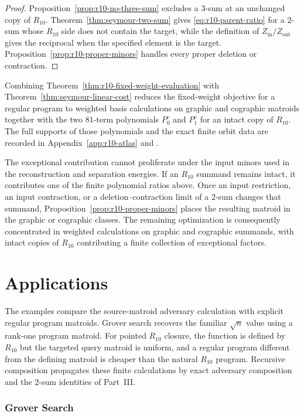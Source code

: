 \documentclass[11pt]{article}
\numberwithin{equation}{section}
\theoremstyle{remark}
\begin{document}
\begin{proof}
Proposition~\ref{prop:r10-no-three-sum} excludes a $3$-sum at an unchanged
copy of $R_{10}$.  Theorem~\ref{thm:seymour-two-sum} gives
\eqref{eq:r10-parent-ratio} for a $2$-sum whose $R_{10}$ side does not contain the target, while the definition
of $Z_{\mathrm{in}}/Z_{\mathrm{out}}$ gives the reciprocal when the
specified element is the target.  Proposition~\ref{prop:r10-proper-minors}
handles every proper deletion or contraction.
\end{proof}

Combining Theorem~\ref{thm:r10-fixed-weight-evaluation} with
Theorem~\ref{thm:seymour-linear-cost} reduces the fixed-weight objective for
a regular program to weighted basis calculations on graphic and cographic
matroids together with the two $81$-term polynomials $P_0^e$ and $P_1^e$ for
an intact copy of $R_{10}$. The full supports of those polynomials and the
exact finite orbit data are recorded in Appendix~\ref{app:r10-atlas} and
.

The exceptional contribution cannot proliferate under the input minors used
in the reconstruction and separation energies. If an $R_{10}$ summand remains
intact, it contributes one of the finite polynomial ratios above. Once an
input restriction, an input contraction, or a deletion--contraction limit of
a $2$-sum changes that summand, Proposition~\ref{prop:r10-proper-minors}
places the resulting matroid in the graphic or cographic classes. The
remaining optimization is consequently concentrated in weighted calculations on
graphic and cographic summands, with intact copies of $R_{10}$ contributing a
finite collection of exceptional factors.

\part{Applications}

The examples compare the source-matroid adversary calculation with explicit
regular program matroids. Grover search recovers the familiar $\sqrt n$
value using a rank-one program matroid. For pointed $R_{10}$ closure, the
function is defined by $R_{10}$ but the targeted query matroid is uniform,
and a regular program different from the defining matroid is cheaper than
the natural $R_{10}$ program. Recursive composition propagates these finite
calculations by exact adversary composition and the $2$-sum identities of
Part~III.

\section{Grover Search}
\label{sec:grover-example}
\label{subsec:or-source-routing-example}
\end{document}
